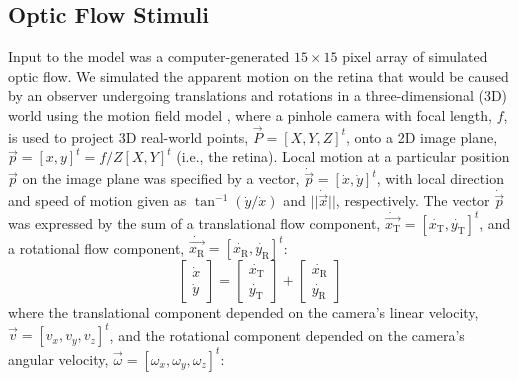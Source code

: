 \subsection{Optic Flow Stimuli}
\label{sec:MSTd|methods|flow}
Input to the model was a computer-generated $15 \times 15$ pixel array of simulated 
optic flow. We simulated the apparent motion on the retina that would be caused by 
an observer undergoing translations and rotations in a three-dimensional (3D) world 
using the motion field model \citep{LonguetHigginsPrazdny1980}, where a pinhole 
camera with focal length, $f$, is used to project 3D real-world points, 
$\vec{P} = [X,Y,Z]^t$, onto a 2D image plane, $\vec{p} = [x,y]^t = f/Z [X,Y]^t$
(i.e., the retina). Local motion at a particular position $\vec{p}$ on the image 
plane was specified by a vector, $\dot{\vec{p}} = [\dot{x},\dot{y}]^t$, with local
direction and speed of motion given as $\tan^{-1}⁡(\dot{y}/\dot{x})$ and
$||\dot{\vec{x}}||$, respectively. The vector $\dot{\vec{p}}$ was expressed by the 
sum of a translational flow component, 
$\dot{\vec{x_{\textrm{T}}}} = [\dot{x_{\textrm{T}}},\dot{y_{\textrm{T}}}]^t$,
and a rotational flow component, 
$\dot{\vec{x_{\textrm{R}}}} = [\dot{x_{\textrm{R}}},\dot{y_{\textrm{R}}}]^t$:
\begin{equation}
\begin{bmatrix}
\dot{x} \\ \dot{y}
\end{bmatrix}
=
\begin{bmatrix}
\dot{x_{\textrm{T}}} \\ \dot{y_{\textrm{T}}}
\end{bmatrix}
+
\begin{bmatrix}
\dot{x_{\textrm{R}}} \\ \dot{y_{\textrm{R}}}
\label{eqn:MSTd|methods|flow}
\end{bmatrix}
\end{equation}
where the translational component depended on the camera's linear velocity, 
$\vec{v} = [v_x,v_y,v_z]^t$, and the rotational component depended on the camera's
angular velocity, $\vec{\omega} = [\omega_x,\omega_y,\omega_z]^t$:
